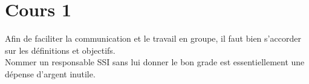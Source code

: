 \section{Cours 1}
Afin de faciliter la communication et le travail en groupe, il faut bien s'accorder sur les d\'efinitions et
objectifs.\\
Nommer un responsable SSI sans lui donner le bon grade est essentiellement une d\'epense d'argent inutile.
